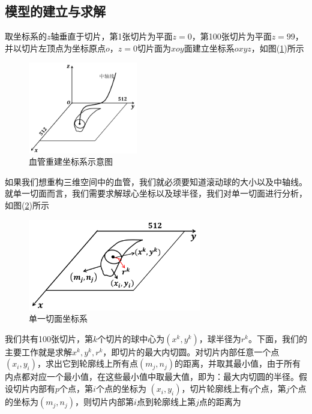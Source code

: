     \subsection{模型的建立与求解}
        \par
        取坐标系的$z$轴垂直于切片，第1张切片为平面$z=0$，第100张切片为平面$z=99$，并以切片左顶点为坐标原点$o$，$z=0$切片面为$xoy$面建立坐标系$oxyz$，如图(\ref{血管重建坐标系示意图})所示
            \begin{figure}[H]
            \centering
            \includegraphics[height=4cm]{images/Reconstruction_of_blood.jpg}
            \caption{血管重建坐标系示意图}
            \label{血管重建坐标系示意图}
            \end{figure}
        \par
        如果我们想重构三维空间中的血管，我们就必须要知道滚动球的大小以及中轴线。就单一切面而言，我们需要求解球心坐标以及球半径，我们对单一切面进行分析，如图(\ref{单一切面坐标系})所示
            \begin{figure}[H]
            \centering
            \includegraphics[height=4cm]{images/single_facet_coordination_system.jpg}
            \caption{单一切面坐标系}
            \label{单一切面坐标系}
            \end{figure}
        \par
        我们共有100张切片，第$k$个切片的球中心为$(x^k,y^k)$，球半径为$r^k$。下面，我们的主要工作就是求解$x^k,y^k,r^k$，即切片的最大内切圆。对切片内部任意一个点$(x_i,y_i)$，求出它到轮廓线上所有点$(m_j,n_j)$的距离，并取其最小值，由于所有内点都对应一个最小值，在这些最小值中取最大值，即为：最大内切圆的半径。假设切片内部有$p$个点，第$i$个点的坐标为 $(x_i,y_i)$，切片轮廓线上有$q$个点，第$j$个点的坐标为$(m_j,n_j)$，则切片内部第$i$点到轮廓线上第$j$点的距离为
